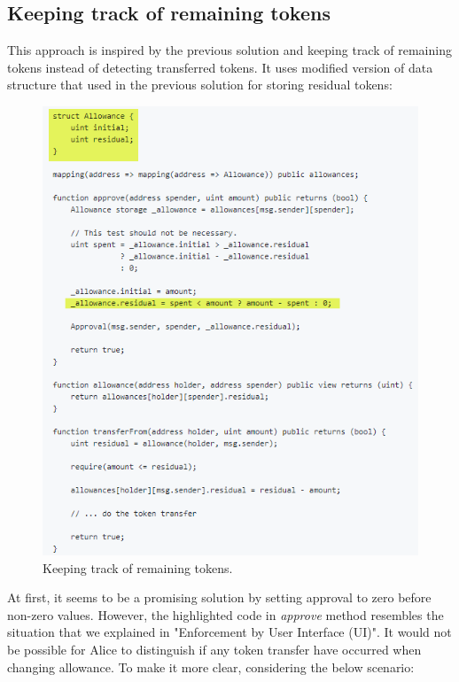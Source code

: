 \subsection{Keeping track of remaining tokens}
This approach\cite{Ref18} is inspired by the previous solution and keeping track of remaining tokens instead of detecting transferred tokens. It uses modified version of data structure that used in the previous solution for storing residual tokens:
\begin{figure}[t]
	\centering
	\includegraphics[width=0.9\linewidth]{figures/multiple_withdrawal_29.png}
	\caption{Keeping track of remaining tokens.}
\end{figure}
\noindent At first, it seems to be a promising solution by setting approval to zero before non-zero values. However, the highlighted code in \textit{approve} method resembles the situation that we explained in "Enforcement by User Interface (UI)". It would not be possible for Alice to distinguish if any token transfer have occurred when changing allowance. To make it more clear, considering the below scenario:  
